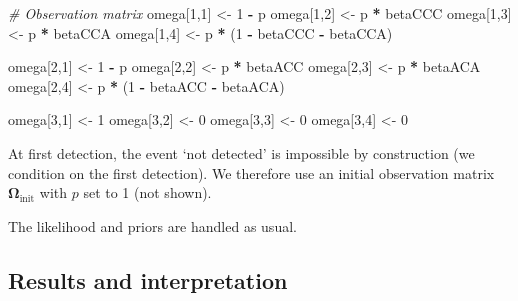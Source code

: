 \documentclass[
  12pt,
]{krantz}
\newenvironment{Shaded}{\begin{snugshade}}{\end{snugshade}}
\newcommand{\CommentTok}[1]{\textcolor[rgb]{0.56,0.35,0.01}{\textit{#1}}}
\newcommand{\DecValTok}[1]{\textcolor[rgb]{0.00,0.00,0.81}{#1}}
\newcommand{\NormalTok}[1]{#1}
\newcommand{\OtherTok}[1]{\textcolor[rgb]{0.56,0.35,0.01}{#1}}
\newcommand{\SpecialCharTok}[1]{\textcolor[rgb]{0.81,0.36,0.00}{\textbf{#1}}}
\begin{document}
\begin{Shaded}
\begin{Highlighting}[]
\CommentTok{\# Observation matrix}
\NormalTok{omega[}\DecValTok{1}\NormalTok{,}\DecValTok{1}\NormalTok{] }\OtherTok{\textless{}{-}} \DecValTok{1} \SpecialCharTok{{-}}\NormalTok{ p}
\NormalTok{omega[}\DecValTok{1}\NormalTok{,}\DecValTok{2}\NormalTok{] }\OtherTok{\textless{}{-}}\NormalTok{ p }\SpecialCharTok{*}\NormalTok{ betaCCC}
\NormalTok{omega[}\DecValTok{1}\NormalTok{,}\DecValTok{3}\NormalTok{] }\OtherTok{\textless{}{-}}\NormalTok{ p }\SpecialCharTok{*}\NormalTok{ betaCCA}
\NormalTok{omega[}\DecValTok{1}\NormalTok{,}\DecValTok{4}\NormalTok{] }\OtherTok{\textless{}{-}}\NormalTok{ p }\SpecialCharTok{*}\NormalTok{ (}\DecValTok{1} \SpecialCharTok{{-}}\NormalTok{ betaCCC }\SpecialCharTok{{-}}\NormalTok{ betaCCA)}

\NormalTok{omega[}\DecValTok{2}\NormalTok{,}\DecValTok{1}\NormalTok{] }\OtherTok{\textless{}{-}} \DecValTok{1} \SpecialCharTok{{-}}\NormalTok{ p}
\NormalTok{omega[}\DecValTok{2}\NormalTok{,}\DecValTok{2}\NormalTok{] }\OtherTok{\textless{}{-}}\NormalTok{ p }\SpecialCharTok{*}\NormalTok{ betaACC}
\NormalTok{omega[}\DecValTok{2}\NormalTok{,}\DecValTok{3}\NormalTok{] }\OtherTok{\textless{}{-}}\NormalTok{ p }\SpecialCharTok{*}\NormalTok{ betaACA}
\NormalTok{omega[}\DecValTok{2}\NormalTok{,}\DecValTok{4}\NormalTok{] }\OtherTok{\textless{}{-}}\NormalTok{ p }\SpecialCharTok{*}\NormalTok{ (}\DecValTok{1} \SpecialCharTok{{-}}\NormalTok{ betaACC }\SpecialCharTok{{-}}\NormalTok{ betaACA)}

\NormalTok{omega[}\DecValTok{3}\NormalTok{,}\DecValTok{1}\NormalTok{] }\OtherTok{\textless{}{-}} \DecValTok{1}
\NormalTok{omega[}\DecValTok{3}\NormalTok{,}\DecValTok{2}\NormalTok{] }\OtherTok{\textless{}{-}} \DecValTok{0}
\NormalTok{omega[}\DecValTok{3}\NormalTok{,}\DecValTok{3}\NormalTok{] }\OtherTok{\textless{}{-}} \DecValTok{0}
\NormalTok{omega[}\DecValTok{3}\NormalTok{,}\DecValTok{4}\NormalTok{] }\OtherTok{\textless{}{-}} \DecValTok{0}
\end{Highlighting}
\end{Shaded}

At first detection, the event `not detected' is impossible by construction (we condition on the first detection). We therefore use an initial observation matrix \(\mathbf{\Omega}_{\text{init}}\) with \(p\) set to 1 (not shown).

The likelihood and priors are handled as usual.

\subsection{Results and interpretation}\label{results-and-interpretation-1}
\end{document}
